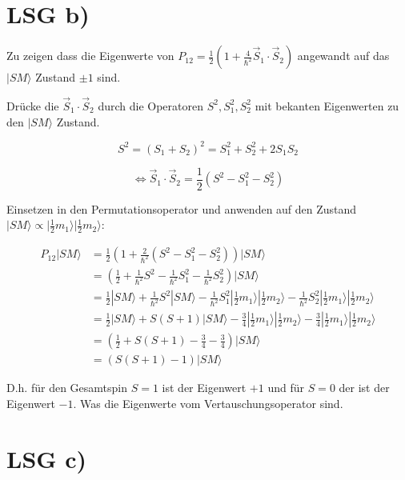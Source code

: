 \section*{LSG b)}

Zu zeigen dass die Eigenwerte von \(P_{12}= \frac{1}{2}\left( 1+\frac{4}{\hbar^2}\vec S_1\cdot \vec S_2\right) \) angewandt auf das \(|SM\rangle \) Zustand \(\pm 1\) sind. 

Drücke die \(\vec S_1\cdot \vec S_2 \) durch die Operatoren \(S^2,S_1^2,S_2^2\)  mit bekanten Eigenwerten zu den \(|SM\rangle \) Zustand. 

\[S^2 = (S_1+S_2)^2 = S_1^2+S_2^2+2S_1S_2\]  

\[\Leftrightarrow  \vec S_1\cdot \vec S_2 = \frac{1}{2}(S^2-S_1^2-S_2^2) \]

Einsetzen in den Permutationsoperator und anwenden auf den Zustand \(|SM\rangle \propto |\frac{1}{2} m_1\rangle |\frac{1}{2} m_2\rangle \):

\begin{align}
P_{12}|SM\rangle  &= \frac{1}{2}\left( 1+\frac{2}{\hbar^2} (S^2-S_1^2-S_2^2)  \right)|SM\rangle   \\
&= (\frac{1}{2}+\frac{1}{\hbar^2} S^2- \frac{1}{\hbar^2}S_1^2-\frac{1}{\hbar^2}S_2^2) |SM\rangle   \\
&= \frac{1}{2}|SM\rangle +\frac{1}{\hbar^2} S^2|SM\rangle - \frac{1}{\hbar^2}S_1^2|\frac{1}{2} m_1\rangle |\frac{1}{2} m_2\rangle  - \frac{1}{\hbar^2}S_2^2|\frac{1}{2} m_1\rangle|\frac{1}{2} m_2\rangle  \\
&= \frac{1}{2}|SM\rangle + S(S+1) |SM\rangle - \frac{3}{4}|\frac{1}{2} m_1\rangle |\frac{1}{2} m_2\rangle  - \frac{3}{4}|\frac{1}{2} m_1\rangle|\frac{1}{2} m_2\rangle  \\
&= (\frac{1}{2} + S(S+1) - \frac{3}{4}  - \frac{3}{4} ) |SM\rangle  \\
&= (S(S+1) - 1 ) |SM\rangle 
\end{align}

D.h. für den Gesamtspin \(S=1\) ist der Eigenwert \(+1\) und für \(S=0\) der ist der Eigenwert \(-1\). Was die Eigenwerte vom Vertauschungsoperator sind.


\section*{LSG c)}

 





